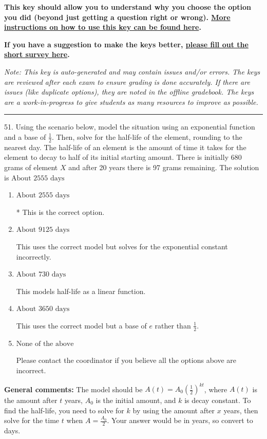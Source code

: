 \documentclass{extbook}[14pt]
\begin{document}
\textbf{This key should allow you to understand why you choose the option you did (beyond just getting a question right or wrong). \href{https://xronos.clas.ufl.edu/mac1105spring2020/courseDescriptionAndMisc/Exams/LearningFromResults}{More instructions on how to use this key can be found here}.}

\textbf{If you have a suggestion to make the keys better, \href{https://forms.gle/CZkbZmPbC9XALEE88}{please fill out the short survey here}.}

\textit{Note: This key is auto-generated and may contain issues and/or errors. The keys are reviewed after each exam to ensure grading is done accurately. If there are issues (like duplicate options), they are noted in the offline gradebook. The keys are a work-in-progress to give students as many resources to improve as possible.}

\rule{\textwidth}{0.4pt}

51. Using the scenario below, model the situation using an exponential function and a base of $\frac{1}{2}$. Then, solve for the half-life of the element, rounding to the nearest day.
The half-life of an element is the amount of time it takes for the element to decay to half of its initial starting amount. There is initially 680 grams of element $X$ and after 20 years there is 97 grams remaining. 
The solution is $ \text{About } 2555 \text{ days} $ 

\begin{enumerate}[label=\Alph*.] 
\item $ \text{About } 2555 \text{ days} $ 

 * This is the correct option. 
\item $ \text{About } 9125 \text{ days} $ 

 This uses the correct model but solves for the exponential constant incorrectly. 
\item $ \text{About } 730 \text{ days} $ 

 This models half-life as a linear function. 
\item $ \text{About } 3650 \text{ days} $ 

 This uses the correct model but a base of $e$ rather than $\frac{1}{2}$. 
\item $ \text{None of the above} $ 

 Please contact the coordinator if you believe all the options above are incorrect. 
\end{enumerate} 
 
\textbf{General comments:} The model should be $A(t) = A_0 (\frac{1}{2})^{kt}$, where $A(t)$ is the amount after $t$ years, $A_0$ is the initial amount, and $k$ is decay constant. To find the half-life, you need to solve for $k$ by using the amount after $x$ years, then solve for the time $t$ when $A = \frac{A_0}{2}$. Your answer would be in years, so convert to days.
\end{document}
